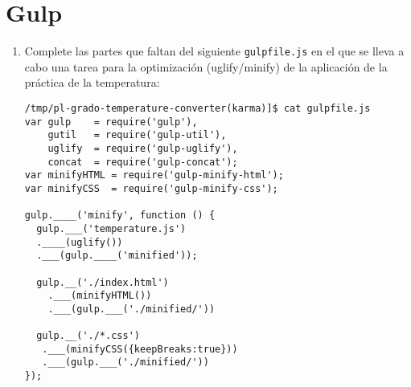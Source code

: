 \documentclass[spanish,a4paper,11pt]{article}
\begin{document}
\section{Gulp}
\begin{enumerate}
\item Complete las partes que faltan
del siguiente \verb|gulpfile.js| en el que se lleva a cabo una
 tarea para la optimización (uglify/minify)
de la aplicación de la práctica de la temperatura:
\begin{verbatim}
/tmp/pl-grado-temperature-converter(karma)]$ cat gulpfile.js 
var gulp    = require('gulp'),
    gutil   = require('gulp-util'),
    uglify  = require('gulp-uglify'),
    concat  = require('gulp-concat');
var minifyHTML = require('gulp-minify-html');
var minifyCSS  = require('gulp-minify-css');

gulp.____('minify', function () {
  gulp.___('temperature.js')
  .____(uglify())
  .___(gulp.____('minified'));

  gulp.__('./index.html')
    .___(minifyHTML())
    .___(gulp.___('./minified/'))

  gulp.__('./*.css')
   .___(minifyCSS({keepBreaks:true}))
   .___(gulp.___('./minified/'))
});
\end{verbatim}
\end{enumerate}

\end{document}
